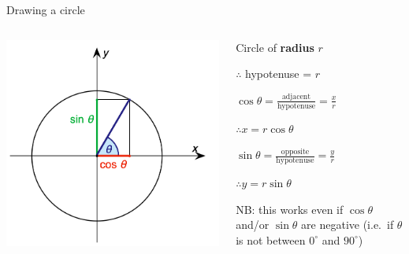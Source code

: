 \begin{frame}{Drawing a circle}
	\begin{columns}
		\begin{column}{0.48\textwidth}
			\includegraphics[width=\textwidth]{unit_circle}
		\end{column}
		\begin{column}{0.48\textwidth}
			\pause Circle of \textbf{radius} $r$
			
			\pause $\therefore$ hypotenuse = $r$
			
			\vspace{2ex}
			
			\pause $\cos \theta = \frac{\text{adjacent}}{\text{hypotenuse}} = \frac{x}{r}$
			
			\pause $\therefore x = r \cos \theta$
			
			\vspace{2ex}
			
			\pause $\sin \theta = \frac{\text{opposite}}{\text{hypotenuse}} = \frac{y}{r}$
			
			\pause $\therefore y = r \sin \theta$

			\vspace{2ex}
			
			\pause NB: this works even if $\cos \theta$ and/or $\sin \theta$ are negative
				(i.e.\ if $\theta$ is not between $0^\circ$ and $90^\circ$)
		\end{column}
	\end{columns}
\end{frame}

